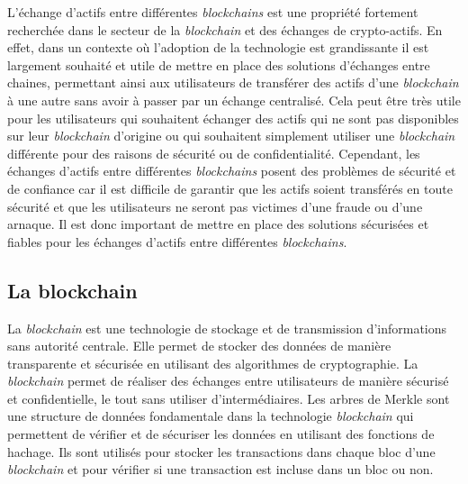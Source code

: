 L'échange d’\gls{actif}s entre différentes \textit{\gls{blockchain}s} est une propriété fortement recherchée dans le secteur de la
\textit{\gls{blockchain}} et des échanges de crypto-\gls{actif}s. En effet, dans un contexte où l’adoption de la technologie est
grandissante \cite{evolutionCrypto2022} il est largement souhaité et utile de mettre en place des solutions d’échanges entre chaines,
permettant ainsi aux utilisateurs de transférer des \gls{actif}s d’une \textit{\gls{blockchain}} à une autre sans avoir à passer par
un échange centralisé. Cela peut être très utile pour les utilisateurs qui souhaitent échanger des \gls{actif}s qui
ne sont pas disponibles sur leur \textit{\gls{blockchain}} d’origine ou qui souhaitent simplement utiliser une \textit{\gls{blockchain}}
différente pour des raisons de sécurité ou de confidentialité. Cependant, les échanges d’\gls{actif}s entre différentes
\textit{\gls{blockchain}s} posent des problèmes de sécurité et de confiance car il est difficile de garantir que les \gls{actif}s soient
transférés en toute sécurité et que les utilisateurs ne seront pas victimes d’une fraude ou d’une arnaque. Il est
donc important de mettre en place des solutions sécurisées et fiables pour les échanges d’\gls{actif}s entre différentes
\textit{\gls{blockchain}s}.

\subsection{La \gls{blockchain}}
La \textit{\gls{blockchain}} est une technologie de stockage et de transmission d’informations sans autorité centrale. Elle 
permet de stocker des données de manière transparente et sécurisée en utilisant des algorithmes de cryptographie. 
La \textit{\gls{blockchain}} permet de réaliser des échanges entre utilisateurs de manière sécurisé et confidentielle, 
le tout sans utiliser d'intermédiaires. Les arbres de Merkle sont une structure de données fondamentale 
dans la technologie \textit{\gls{blockchain}} qui permettent de vérifier et de sécuriser les données en utilisant des 
fonctions de hachage. Ils sont utilisés pour stocker les transactions dans 
chaque bloc d’une \textit{\gls{blockchain}} et pour vérifier si une transaction est incluse dans un bloc ou non.

